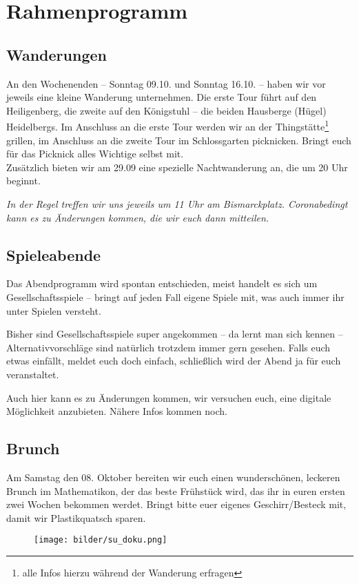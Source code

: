 \section{Rahmenprogramm}
\subsection{Wanderungen}
An den Wochenenden -- Sonntag 09.10. und Sonntag 16.10. -- haben wir vor jeweils eine kleine Wanderung unternehmen. Die erste Tour führt auf den Heiligenberg, die zweite auf den Königstuhl -- die beiden Hausberge (Hügel) Heidelbergs. Im Anschluss an die erste Tour werden wir an der Thingstätte\footnote{alle Infos hierzu während der Wanderung erfragen} grillen, im Anschluss an die zweite Tour im Schlossgarten picknicken. Bringt euch für das Picknick alles Wichtige selbst mit.\\

Zusätzlich bieten wir am 29.09 eine spezielle Nachtwanderung an, die um 20 Uhr beginnt.

\noindent\emph{In der Regel treffen wir uns jeweils um 11 Uhr am Bismarckplatz. Coronabedingt kann es zu Änderungen kommen, die wir euch dann mitteilen.}

\vfill


\eject

\subsection{Spieleabende}
Das Abendprogramm wird spontan entschieden, meist handelt es sich um Gesellschaftsspiele -- bringt auf jeden Fall eigene Spiele mit, was auch immer ihr unter Spielen versteht.

Bisher sind Gesellschaftsspiele super angekommen -- da lernt man sich kennen -- Alternativvorschläge sind natürlich trotzdem immer gern gesehen. Falls euch etwas einfällt, meldet euch doch einfach, schließlich wird der Abend ja für euch veranstaltet.

Auch hier kann es zu Änderungen kommen, wir versuchen euch, eine digitale Möglichkeit anzubieten. Nähere Infos kommen noch.

\subsection{Brunch}
Am Samstag den 08. Oktober bereiten wir euch einen wunderschönen, leckeren Brunch im \gls{Mathematikon}, der das beste Frühstück wird, das ihr in euren ersten zwei Wochen bekommen werdet. Bringt bitte euer eigenes Geschirr/Besteck mit, damit wir Plastikquatsch sparen.


\vspace{4cm}

\begin{figure}[h]
\centering
\texttt{[image: bilder/su\_doku.png]}
\end{figure}
